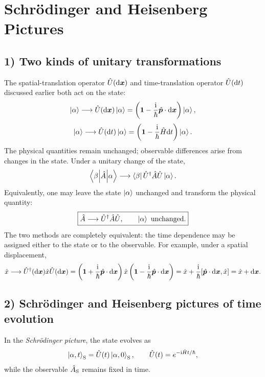 \section{Schr\"odinger and Heisenberg Pictures}
\subsection*{1) Two kinds of unitary transformations}
The spatial-translation operator $\hat{U}(\mathrm{d}\bm{x})$ and time-translation operator $\hat{U}(\mathrm{d} t)$ discussed earlier both act on the state:
\begin{equation}
\left|\alpha\right\rangle\longrightarrow\hat{U}(\mathrm{d}\bm{x})\left|\alpha\right\rangle
=\left(\mathbf1-\frac{\mathrm{i}}{\hbar}\hat{\bm{p}}\cdot\mathrm{d}\bm{x}\right)\left|\alpha\right\rangle,
\end{equation}
\begin{equation}
\left|\alpha\right\rangle\longrightarrow\hat{U}(\mathrm{d} t)\left|\alpha\right\rangle
=\left(\mathbf1-\frac{\mathrm{i}}{\hbar}\hat{H}\mathrm{d} t\right)\left|\alpha\right\rangle.
\end{equation}
The physical quantities remain unchanged; observable differences arise from changes in the state. Under a unitary change of the state,
\begin{equation}
\left\langle\beta\middle|\hat{A}\middle|\alpha\right\rangle\longrightarrow
\left\langle\beta\right|\hat{U}^{\dagger}\hat{A}\hat{U}\left|\alpha\right\rangle.
\end{equation}
Equivalently, one may leave the state $\left|\alpha\right\rangle$ unchanged and transform the physical quantity:
\begin{equation}
\boxed{\hat{A}\longrightarrow\hat{U}^{\dagger}\hat{A}\hat{U},\qquad\left|\alpha\right\rangle\ \text{unchanged}.}
\end{equation}
The two methods are completely equivalent: the time dependence may be assigned either to the state or to the observable. For example, under a spatial displacement,
\begin{equation}
\hat{x}\longrightarrow\hat{U}^{\dagger}(\mathrm{d}\bm{x})\hat{x}\hat{U}(\mathrm{d}\bm{x})
=\left(\mathbf1+\frac{\mathrm{i}}{\hbar}\hat{\bm{p}}\cdot\mathrm{d}\bm{x}\right)
\hat{x}\left(\mathbf1-\frac{\mathrm{i}}{\hbar}\hat{\bm{p}}\cdot\mathrm{d}\bm{x}\right)
=\hat{x}+\frac{\mathrm{i}}{\hbar}[\hat{\bm{p}}\cdot\mathrm{d}\bm{x},\hat{x}]
=\hat{x}+\mathrm{d}\bm{x}.
\end{equation}

\subsection*{2) Schr\"odinger and Heisenberg pictures of time evolution}
In the \emph{Schr\"odinger picture}, the state evolves as
\begin{equation}
\left|\alpha,t\right\rangle_{\mathrm S}=\hat{U}(t)\left|\alpha,0\right\rangle_{\mathrm S},\qquad
\hat{U}(t)=e^{-\mathrm{i}\hat{H}t/\hbar},
\end{equation}
while the observable $\hat{A}_{\mathrm S}$ remains fixed in time.

